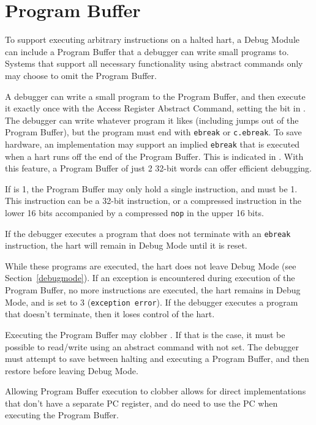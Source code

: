 \section{Program Buffer} \label{programbuffer}

To support executing arbitrary instructions on a halted hart,
a Debug Module can include a Program Buffer that a debugger
can write small programs to. Systems
that support all necessary functionality using abstract commands
only may choose to omit the Program Buffer.

A debugger can write a small program to the Program Buffer, and then
execute it exactly once with the Access Register Abstract Command,
setting the \Fpostexec bit in \Rcommand.
The debugger can write whatever program it likes (including jumps out of the
Program Buffer), but the program must end with
{\tt ebreak} or {\tt c.ebreak}. To save hardware, an implementation may support
an implied {\tt ebreak} that is executed when a hart runs off the end of the
Program Buffer. This is indicated in \Fimpebreak. With this feature, a Program
Buffer of just 2 32-bit words can offer efficient debugging.

If \Fprogbufsize is 1, the Program Buffer may only hold a single instruction,
and \Fimpebreak must be 1.
This instruction can be a 32-bit
instruction, or a compressed instruction in the lower 16 bits accompanied by a
compressed {\tt nop} in the upper 16 bits.

If the debugger executes a program that does not
terminate with an {\tt ebreak} instruction, the hart will remain in Debug Mode
until it is reset.

While these programs are executed, the hart does not leave Debug Mode (see
Section~\ref{debugmode}).  If an exception is encountered during execution of
the Program Buffer, no more instructions are executed, the hart remains in Debug
Mode, and \Fcmderr is set to 3 ({\tt exception error}).  If the debugger
executes a program that doesn't terminate, then it loses control of the hart.

Executing the Program Buffer may clobber \Rdpc. If that is the case, it must be
possible to read/write \Rdpc using an abstract command with \Fpostexec not set.
The debugger must attempt to save \Rdpc between halting and
executing a Program Buffer, and then restore \Rdpc before leaving Debug Mode.

\begin{commentary}
    Allowing Program Buffer execution to clobber \Rdpc allows for direct
    implementations that don't have a separate PC register, and do need to use
    the PC when executing the Program Buffer.
\end{commentary}

